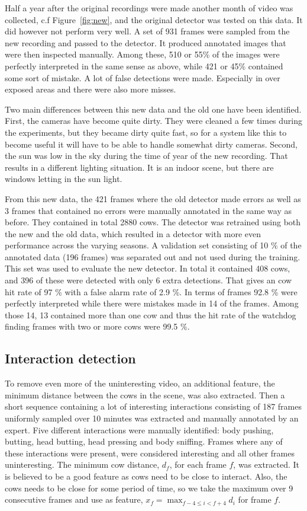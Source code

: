 \documentclass{cta-author}
\begin{document}
Half a year after the original recordings were made another month of video was collected, c.f 
Figure~\ref{fig:new}, and the original detector was tested on this data. It did however not perform very 
well. A set of 931 frames were sampled from the new recording and passed to the detector. It produced 
annotated images that were then inspected manually. Among these, 510 or 55\% of the images were perfectly 
interpreted in the same sense as above, while 421 or 45\% contained some sort of mistake.
A lot of false detections were made. Especially in over exposed areas and there were also more misses. 

Two main differences between this new data and the old one have been identified. 
First, the cameras have become quite dirty. They were cleaned a few times during the experiments, but they 
became dirty quite fast, so for a system like this to become useful it will have to be able to handle 
somewhat dirty cameras. Second, the sun was low in the sky during  the time of year of the new recording. 
That results in a different lighting situation. It is an indoor scene, but there are windows letting in the 
sun light.

From this new data, the 421 frames where the old detector made errors as well as 3 frames that contained no 
errors were manually annotated in the same way as before. They contained in total 2880 cows. The detector was 
retrained using both the new and the old data, which resulted in a detector with more even performance across 
the varying seasons. A validation set consisting of 10 \% of the annotated data (196 frames) was separated 
out and not used during the training. This set was used to evaluate the new detector. In total it contained 
408 cows, and 396 of these were detected with only 6 extra detections. That gives an cow hit rate of 97 \% 
with a false alarm rate of 2.9 \%. In terms of frames 92.8 \% were perfectly interpreted while there were 
mistakes made in 14 of the frames. Among those 14, 13 contained more than one cow and thus the hit rate of 
the watchdog finding frames with two or more cows were 99.5 \%.

\subsection{Interaction detection}
To remove even more of the uninteresting video, an additional feature, the minimum distance between the cows 
in the scene, was also extracted. Then a short sequence containing a lot of interesting interactions 
consisting of 187 frames uniformly sampled over 10 minutes was extracted and manually annotated by an expert. 
Five different interactions were manually identified: body pushing, butting, head butting, head pressing and 
body sniffing. Frames where any of these interactions were present, were considered interesting and all other 
frames uninteresting. The minimum cow distance, $d_f$, for each frame $f$, was extracted. It is believed to 
be a good feature as cows need to be close to interact. Also, the cows needs to be close for some period of 
time, so we take the maximum over 9 consecutive frames and use as feature, 
$x_f = \max_{f-4 \leq i < f+4} d_i$ for frame $f$.
\end{document}
